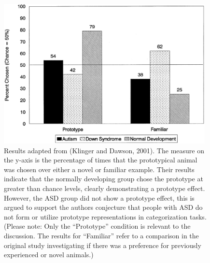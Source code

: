 \begin{figure}[ht]
\begin{center}
	\includegraphics[width=110mm]{figures/klinger_results.eps}
\end{center}
\caption{Results adapted from (Klinger and Dawson, 2001).  The measure on the y-axis is the percentage of times that the prototypical animal was chosen over either a novel or familiar example. Their results indicate that the normally developing group chose the prototype at greater than chance levels, clearly demonstrating a prototype effect.  However, the ASD group did not show a prototype effect, this is argued to support the authors conjecture that people with ASD do not form or utilize prototype representations in categorization tasks. (Please note: Only the ``Prototype'' condition is relevant to the discussion.  The results for ``Familiar'' refer to a comparison in the original study investigating if there was a preference for previously experienced or novel animals.)}
\label{klinger_results}
\end{figure} 

